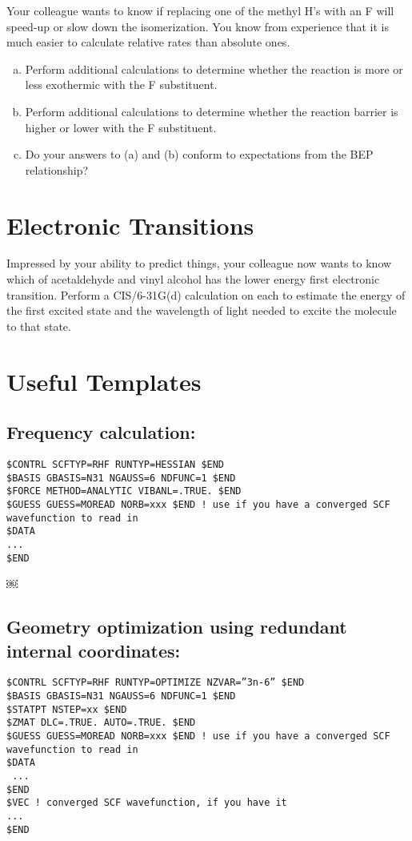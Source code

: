 \documentclass[11pt]{article}
\begin{document}
Your colleague wants to know if replacing one of the methyl H’s with an F will speed-up or slow down the isomerization. You know from experience that it is much easier to calculate relative rates than absolute ones.
\begin{enumerate}[(a)]
\item Perform additional calculations to determine whether the reaction is more or less exothermic with the F substituent.

\item Perform additional calculations to determine whether the reaction barrier is higher or lower with the F substituent.

\item Do your answers to (a) and (b) conform to expectations from the BEP relationship?
\end{enumerate}

\section{Electronic Transitions}
\label{sec:org77a283f}

Impressed by your ability to predict things, your colleague now wants to know which of acetaldehyde and vinyl alcohol has the lower energy first electronic transition. Perform a CIS/6-31G(d) calculation on each to estimate the energy of the first excited state and the wavelength of light needed to excite the molecule to that state.

\section{Useful Templates}
\label{sec:org82321ec}

\subsection{Frequency calculation:}
\label{sec:org7226b39}
\begin{verbatim}
$CONTRL SCFTYP=RHF RUNTYP=HESSIAN $END
$BASIS GBASIS=N31 NGAUSS=6 NDFUNC=1 $END
$FORCE METHOD=ANALYTIC VIBANL=.TRUE. $END
$GUESS GUESS=MOREAD NORB=xxx $END ! use if you have a converged SCF wavefunction to read in
$DATA
...
$END
\end{verbatim}

￼
\subsection{Geometry optimization using redundant internal coordinates:}
\label{sec:org3d0066b}
\begin{verbatim}
$CONTRL SCFTYP=RHF RUNTYP=OPTIMIZE NZVAR=”3n-6” $END
$BASIS GBASIS=N31 NGAUSS=6 NDFUNC=1 $END
$STATPT NSTEP=xx $END
$ZMAT DLC=.TRUE. AUTO=.TRUE. $END
$GUESS GUESS=MOREAD NORB=xxx $END ! use if you have a converged SCF wavefunction to read in
$DATA
 ...
$END
$VEC ! converged SCF wavefunction, if you have it
...
$END
\end{verbatim}
\end{document}
